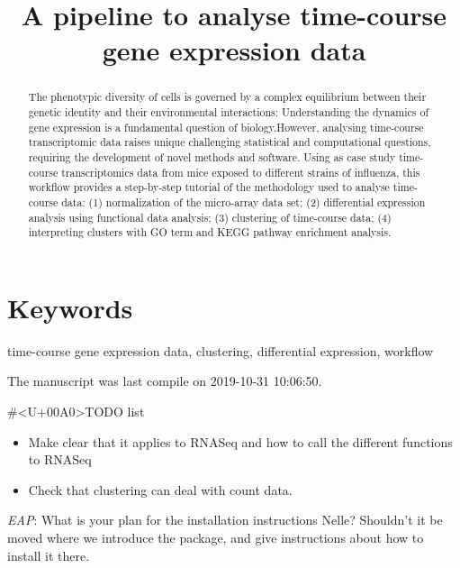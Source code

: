 \documentclass[9pt,a4paper,]{extarticle}
\begin{document}
\pagestyle{front}

\title{A pipeline to analyse time-course gene expression data}


\maketitle
\thispagestyle{front}

\begin{abstract}
The phenotypic diversity of cells is governed by a complex equilibrium between their genetic identity and their environmental interactions: Understanding the dynamics of gene expression is a fundamental question of biology.However, analysing time-course transcriptomic data raises unique challenging statistical and computational questions, requiring the development of novel methods and software. Using as case study time-course transcriptomics data from mice exposed to different strains of influenza, this workflow provides a step-by-step tutorial of the methodology used to analyse time-course data: (1) normalization of the micro-array data set; (2) differential expression analysis using functional data analysis; (3) clustering of time-course data; (4) interpreting clusters with GO term and KEGG pathway enrichment analysis.
\end{abstract}

\section*{Keywords}
time-course gene expression data, clustering, differential expression, workflow


\clearpage
\pagestyle{main}

The manuscript was last compile on 2019-10-31 10:06:50.

\#\textless{}U+00A0\textgreater{}TODO list

\begin{itemize}
\tightlist
\item
  Make clear that it applies to RNASeq and how to call the different functions
  to RNASeq
\item
  Check that clustering can deal with count data.
\end{itemize}

\emph{EAP}: What is your plan for the installation instructions Nelle? Shouldn't it be moved where we introduce the package, and give instructions about how to install it there.
\end{document}

